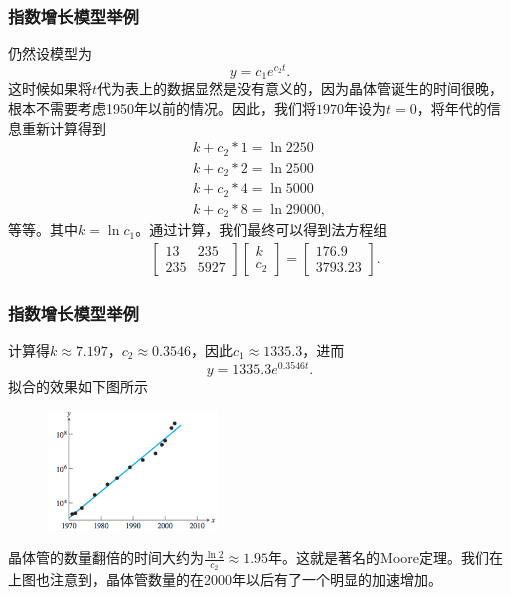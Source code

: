 \documentclass[10pt]{beamer}
\begin{document}
\begin{frame}
\frametitle{指数增长模型举例}
仍然设模型为
\begin{equation}
y = c_1 e^{c_2 t}.
\end{equation}
这时候如果将$t$代为表上的数据显然是没有意义的，因为晶体管诞生的时间很晚，根本不需要考虑1950年以前的情况。因此，我们将$1970$年设为$t = 0$，将年代的信息重新计算得到
\begin{align}
k + c_2 * 1= \ln 2250 \nonumber \\
k + c_2 * 2= \ln 2500 \nonumber \\
k + c_2 * 4= \ln 5000 \nonumber \\
k + c_2 * 8= \ln 29000,
\end{align}
等等。其中$k = \ln c_1$。通过计算，我们最终可以得到法方程组
\begin{align}
&\left[ \begin{array}{cc}
     13    & 235    \\
     235    &   5927         
            \end{array} \right] 
\left[ \begin{array}{c} 
      k \\ c_2  \end{array} \right] 
=
\left[ \begin{array}{c}
      176.9 \\ 3793.23  \end{array} \right] .
\end{align}
\end{frame}


\begin{frame}
\frametitle{指数增长模型举例}
计算得$k \approx 7.197$，$c_2 \approx 0.3546$，因此$c_1  \approx 1335.3$，进而
\begin{equation}
y = 1335.3 e^{0.3546 t}.
\end{equation}
拟合的效果如下图所示
\begin{figure}
\includegraphics[width=4.5cm]{figs/4-2-2_Exponential_Growth-4} 
\end{figure}
晶体管的数量翻倍的时间大约为$\frac{\ln 2}{c_2} \approx 1.95$年。这就是著名的Moore定理。我们在上图也注意到，晶体管数量的在2000年以后有了一个明显的加速增加。
\end{frame}
\end{document}
